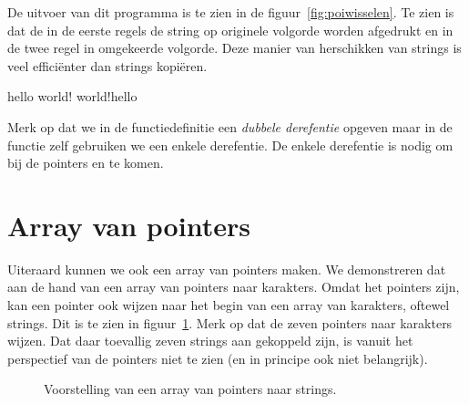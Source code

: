 De uitvoer van dit programma is te zien in de figuur~\ref{fig:poiwisselen}. Te zien is dat de in de eerste regels de string op originele volgorde worden afgedrukt en in de twee regel in omgekeerde volgorde. Deze manier van herschikken van strings is veel efficiënter dan strings kopiëren.

\begin{dosbox}[title=Verwisselen van twee stings.,label=fig:poiwisselen]
hello world!
world!hello
\end{dosbox}

Merk op dat we in de functiedefinitie een \textsl{dubbele derefentie} opgeven maar in de functie zelf gebruiken we een enkele derefentie. De enkele derefentie is nodig om bij de pointers  en  te komen.


\section{Array van pointers}
Uiteraard kunnen we ook een array van pointers maken. We demonstreren dat aan de hand van een array van pointers naar karakters. Omdat het pointers zijn, kan een pointer ook wijzen naar het begin van een array van karakters, oftewel strings. Dit is te zien in figuur~\ref{fig:poiarrayofpointers}. Merk op dat de zeven pointers naar karakters wijzen. Dat daar toevallig zeven strings aan gekoppeld zijn, is vanuit het perspectief van de pointers niet te zien (en in principe ook niet belangrijk).

\begin{figure}[!ht]
\centering
{}
\caption{Voorstelling van een array van pointers naar strings.}
\label{fig:poiarrayofpointers}
\end{figure}

